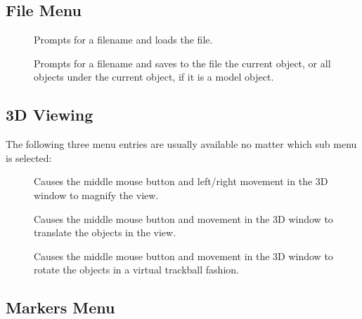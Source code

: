 \subsection{File Menu}

\begin{description}
\item[]  Prompts for a filename and loads the file.
\item[]  Prompts for a filename and saves to the file
        the current object, or all objects under the current object, if it is
        a model object.
\end{description}

\subsection{3D Viewing}

The following three menu entries are usually available no matter which sub
menu is selected:

\begin{description}
\item[]  Causes the middle mouse button and left/right movement
                       in the 3D window to magnify the view.
\item[]  Causes the middle mouse button and movement
                       in the 3D window to translate the objects in the view.
\item[]  Causes the middle mouse button and movement
                       in the 3D window to rotate the objects in a virtual
                       trackball fashion.
\end{description}

\subsection{Markers Menu}

